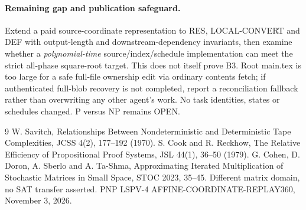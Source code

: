\documentclass[11pt]{article}
\begin{document}
\paragraph{Remaining gap and publication safeguard.}
Extend a paid source-coordinate representation to RES, LOCAL-CONVERT and DEF with output-length and downstream-dependency invariants, then examine whether a \emph{polynomial-time} source/index/schedule implementation can meet the strict all-phase square-root target. This does not itself prove B3. Root main.tex is too large for a safe full-file ownership edit via ordinary contents fetch; if authenticated full-blob recovery is not completed, report a reconciliation fallback rather than overwriting any other agent's work. No task identities, states or schedules changed. P versus NP remains OPEN.

\begin{thebibliography}{9}
 W. Savitch, Relationships Between Nondeterministic and Deterministic Tape Complexities, JCSS 4(2), 177--192 (1970).
 S. Cook and R. Reckhow, The Relative Efficiency of Propositional Proof Systems, JSL 44(1), 36--50 (1979).
 G. Cohen, D. Doron, A. Sberlo and A. Ta-Shma, Approximating Iterated Multiplication of Stochastic Matrices in Small Space, STOC 2023, 35--45. Different matrix domain, no SAT transfer asserted.
 PNP LSPV-4 AFFINE-COORDINATE-REPLAY360, November 3, 2026.
\end{thebibliography}
\end{document}
